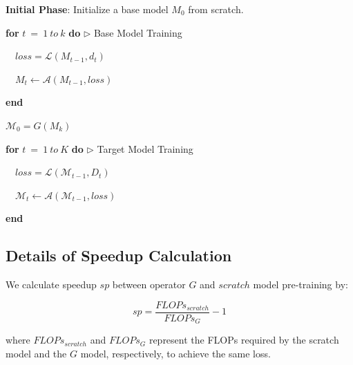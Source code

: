 \documentclass{article}
\begin{document}
\begin{algorithm}[H]
{}
\textbf{Initial Phase}: Initialize a base model $M_0$ from scratch.

\textbf{for} {$t\ =\ 1\ to\ k$} \textbf{do} \hspace{\fill} $\triangleright$ Base Model Training

$\quad loss = \mathcal{L}(M_{t-1}, d_t)$

$\quad M_t \gets \mathcal{A}(M_{t-1}, loss)$

\textbf{end}

$\mathcal{M}_0 = G(M_k)$

\textbf{for} {$t\ =\ 1\ to\ K$} \textbf{do} \hspace{\fill} $\triangleright$ Target Model Training

$\quad loss = \mathcal{L}(\mathcal{M}_{t-1}, D_t)$

$\quad \mathcal{M}_t \gets \mathcal{A}(\mathcal{M}_{t-1}, loss)$

\textbf{end}

\caption{LLMs Training with Growth Operator}
\label{alg:model_growth}
\end{algorithm}

\subsection{Details of Speedup Calculation}\label{app:speedup}
We calculate speedup $sp$ between operator $G$ and $scratch$ model pre-training by:

\begin{equation}
    sp = \frac{FLOPs_{scratch}}{FLOPs_{G}} - 1
\end{equation}

where $FLOPs_{scratch}$ and $FLOPs_{G}$ represent the FLOPs required by the scratch model and the $G$ model, respectively, to achieve the same loss.
\end{document}

